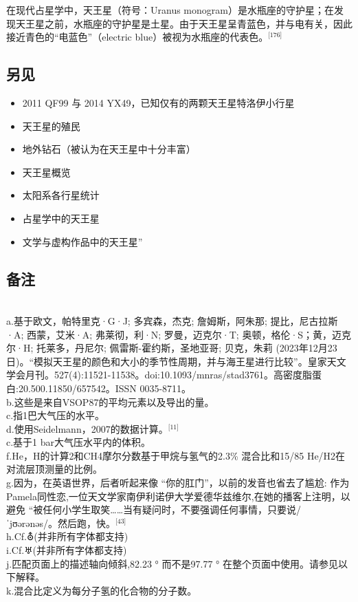在现代占星学中，天王星（符号：Uranus monogram）是水瓶座的守护星；在发现天王星之前，水瓶座的守护星是土星。由于天王星呈青蓝色，并与电有关，因此接近青色的“电蓝色”（electric blue）被视为水瓶座的代表色。$^{\text{[176]}}$
\subsection{另见}
\begin{itemize}
\item 2011 QF99 与 2014 YX49，已知仅有的两颗天王星特洛伊小行星
\item 天王星的殖民
\item 地外钻石（被认为在天王星中十分丰富）
\item 天王星概览
\item 太阳系各行星统计
\item 占星学中的天王星
\item 文学与虚构作品中的天王星”
\end{itemize}
\subsection{备注}\\
a.基于欧文，帕特里克·G·J; 多宾森，杰克; 詹姆斯，阿朱那; 提比，尼古拉斯·A; 西蒙，艾米·A; 弗莱彻，利·N; 罗曼，迈克尔·T; 奥顿，格伦·S；黄，迈克尔·H; 托莱多，丹尼尔; 佩雷斯-霍约斯，圣地亚哥; 贝克，朱莉 (2023年12月23日)。“模拟天王星的颜色和大小的季节性周期，并与海王星进行比较”。皇家天文学会月刊。527(4):11521-11538。doi:10.1093/mnras/stad3761。高密度脂蛋白:20.500.11850/657542。ISSN 0035-8711。\\
b.这些是来自VSOP87的平均元素以及导出的量。\\
c.指1巴大气压的水平。\\
d.使用Seidelmann，2007的数据计算。$^{\text{[11]}}$\\
c.基于1 bar大气压水平内的体积。\\
f.He，H的计算2和CH4摩尔分数基于甲烷与氢气的2.3\% 混合比和15/85 He/H2在对流层顶测量的比例。\\
g.因为，在英语世界，后者听起来像 “你的肛门”，以前的发音也省去了尴尬: 作为Pamela同性恋,一位天文学家南伊利诺伊大学爱德华兹维尔,在她的播客上注明，以避免 “被任何小学生取笑……当有疑问时，不要强调任何事情，只要说/ˈjʊərənəs/。然后跑，快。$^{\text{[43]}}$\\
h.Cf.⛢(并非所有字体都支持)\\
i.Cf.♅(并非所有字体都支持)\\
j.匹配页面上的描述轴向倾斜,82.23 ° 而不是97.77 ° 在整个页面中使用。请参见以下解释。\\
k.混合比定义为每分子氢的化合物的分子数。










